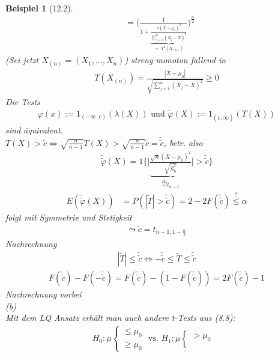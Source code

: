 \documentclass[a4paper,openany]{book}
\theoremstyle{mytheoremstyle}
\newtheorem*{bei}{Beispiel}
\theoremstyle{mytheoremstyle2}
\begin{document}
\begin{bei}[12.2]
\begin{align*}
    &=\Bigg(\frac{1}{1+\underbrace{\frac{n(\bar{X}-\mu _0)^2}{\sum_{j=1}^{n}{(X_j-\bar{X})^2}}}_{=:T^2(X _{(n)})}}\Bigg)^{\frac{n}{2}}
  \end{align*}
  (Sei jetzt $X _{(n)}=(X_1,...,X_n)$) streng monoton fallend in 
  \begin{align*}
    T(X _{(n)})=\frac{|\bar{X}-\mu _0|}{\sqrt{\sum_{j=1}^{n}{(X_j-\bar{X})^2}}}\geq 0
  \end{align*}
  Die Tests
  \begin{align*}
    \varphi (x):=1_{(-\infty ,c)}(\lambda (X))\text{ und }\tilde{\varphi} (X):=1_{(\tilde{c},\infty )}(T(X))
  \end{align*}
  sind äquivalent. \\
  $T(X)>\tilde{c} \Leftrightarrow \sqrt{\frac{n}{n-1}}T(X)>\sqrt{\frac{n}{n-1}}\tilde{c}=\tilde{\tilde{c}}$, betr. also 
  \begin{align*}
    \tilde{\tilde{\varphi }}(X)=1 \bigg\{\bigg|\underbrace{\frac{\sqrt{n}(\bar{X}-\mu _0)^2}{\sqrt{\hat{S}_n^2}}}_{\overset{H_0}\sim t _{n-1}}\bigg|>\tilde{\tilde{c}}\bigg\}
  \end{align*}
  \begin{align*}
    E(\tilde{\tilde{\varphi }}(X))
    &=P(|\tilde{T}|>\tilde{\tilde{c}})=2-2F(\tilde{\tilde{c}})\overset{!}\leq \alpha 
  \end{align*}
  folgt mit Symmetrie und Stetigkeit
  \begin{align*}
    \leadsto\tilde{c}=t _{n-1,1-\frac{\alpha }{2}}
  \end{align*}
  Nachrechnung
  \begin{align*}
    |\tilde{T}|\leq \tilde{\tilde{c}}\Leftrightarrow -\tilde{\tilde{c}}\leq \tilde{T}\leq \tilde{\tilde{c}}
  \end{align*}
  \begin{align*}
    F(\tilde{\tilde{c}})-F(-\tilde{\tilde{c}})=F(\tilde{\tilde{c}})-(1-F(\tilde{\tilde{c}}))=2F(\tilde{\tilde{c}})-1
  \end{align*}
  Nachrechnung vorbei \\
  (b) \\
  Mit dem LQ Ansatz erhält man auch andere t-Tests aus (8.8):
  \begin{align*}
    H_0:\mu \begin{cases}
      \leq \mu _0 \\
      \geq \mu _0
    \end{cases}\text{ vs. }H_1:\mu \begin{cases}
      > \mu _0 &\\

\end{cases}
\end{align*}
\end{bei}
\end{document}
